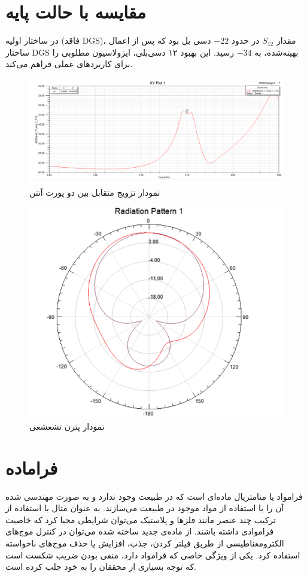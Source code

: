 \section{مقایسه با حالت پایه}
 در ساختار اولیه (فاقد DGS)، مقدار 
 $S_{12}$
 در حدود 
 $-22$
  دسی بل بود که پس از اعمال ساختار DGS بهینه‌شده، به 
  $-34$
    رسید. این بهبود ۱۲ دسی‌بلی، ایزولاسیون مطلوبی را برای کاربردهای عملی فراهم می‌کند.
\begin{figure}
	\centering
	\includegraphics[scale=0.3]{Images/fig31.png}
	\caption{نمودار تزویج متقابل بین دو پورت آنتن}
	\label{fig31}
\end{figure}
    
\begin{figure}
	\centering
	\includegraphics[scale=0.5]{Images/fig32.png}
	\caption{نمودار پترن تشعشعی}
	\label{fig32}
\end{figure}
 
 
\section{فراماده}
 فرامواد یا متامتریال
  ماده‌ای است که در طبیعت وجود ندارد و به صورت مهندسی شده آن را با استفاده از مواد موجود در طبیعت می‌سازند. به عنوان مثال با استفاده از ترکیب چند عنصر مانند فلزها و پلاستیک می‌توان شرایطی محیا کرد که خاصیت فراموادی داشته باشند. از ماده‌ی جدید ساخته شده می‌توان در کنترل موج‌های الکترومغناطیسی از طریق فیلتر کردن، جذب، افزایش یا حذف موج‌های ناخواسته استفاده کرد. یکی از ویژگی خاصی که فرامواد دارد، منفی بودن ضریب شکست است که توجه بسیاری از محققان را به خود جلب کرده است. 
  
